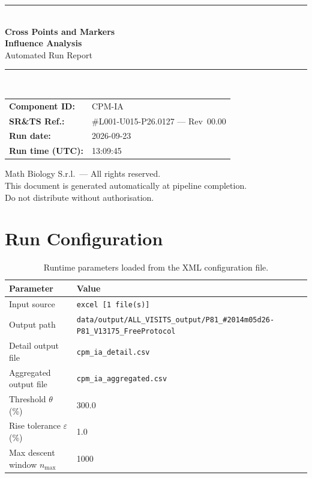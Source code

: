 \documentclass[a4paper,11pt]{article}
\begin{document}
\begin{titlepage}
\begin{center}
  \vspace*{1.8cm}
  {\color{dmaaccent}\rule{\linewidth}{1.5pt}}\\[0.6cm]
  {\LARGE\bfseries\color{dmaaccent}
    Cross Points and Markers\\[0.25cm]
    Influence Analysis}\\[0.4cm]
  {\Large Automated Run Report}\\[0.3cm]
  {\color{dmaaccent}\rule{\linewidth}{1.5pt}}\\[2cm]

  \begin{tabular}{ll}
    \textbf{Component ID:}   & CPM-IA \\[0.3cm]
    \textbf{SR\&TS Ref.:}    & \#L001-U015-P26.0127 --- Rev~00.00 \\[0.3cm]
    \textbf{Run date:}       & 2026-09-23 \\[0.3cm]
    \textbf{Run time (UTC):} & 13:09:45 \\
  \end{tabular}

  \vfill
  {\color{dmagray}\small
    Math Biology S.r.l.\ --- All rights reserved.\\
    This document is generated automatically at pipeline completion.\\
    Do not distribute without authorisation.}
\end{center}
\end{titlepage}

\tableofcontents
\clearpage

\section{Run Configuration}

\begin{table}[h!]
\centering
\small
\caption{Runtime parameters loaded from the XML configuration file.}
\begin{tabular}{ll}
\toprule
\textbf{Parameter} & \textbf{Value} \\
\midrule
Input source                      & \texttt{excel [1 file(s)]} \\
Output path                       & \texttt{data/output/ALL\_VISITS\_output/P81\_\#2014m05d26-P81\_V13175\_FreeProtocol} \\
Detail output file                & \texttt{cpm\_ia\_detail.csv} \\
Aggregated output file            & \texttt{cpm\_ia\_aggregated.csv} \\
Threshold $\theta$ (\%)           & 300.0 \\
Rise tolerance $\varepsilon$ (\%) & 1.0 \\
Max descent window $n_{\max}$     & 1000 \\
\bottomrule
\end{tabular}
\end{table}
\end{document}
